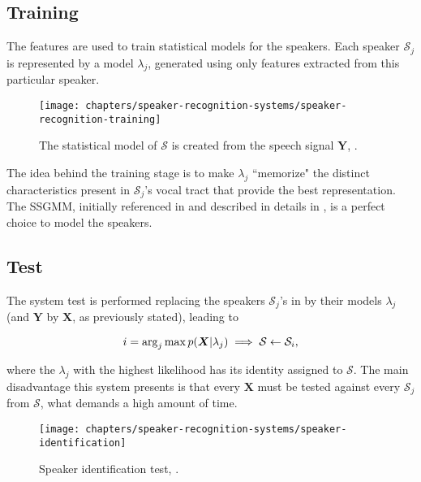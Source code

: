 \subsection{Training}

The features are used to train statistical models for the speakers. Each speaker $\mathcal{S}_j$ is represented by a model $\lambda_j$, generated using only features extracted from this particular speaker.

\begin{figure}[ht]
    \centering
    \texttt{[image: chapters/speaker-recognition-systems/speaker-recognition-training]}
    \caption{The statistical model of $\mathcal{S}$ is created from the speech signal $\boldsymbol{Y}$, .}
    \label{fig:speaker-recognition-training}
\end{figure}

The idea behind the training stage is to make $\lambda_j$ ``memorize" the distinct characteristics present in $\mathcal{S}_j$'s vocal tract that provide the best representation. The SSGMM, initially referenced in  and described in details in , is a perfect choice to model the speakers.

\subsection{Test}

The system test is performed replacing the speakers $\mathcal{S}_j$'s in  by their models $\lambda_j$ (and $\boldsymbol{Y}$ by $\boldsymbol{X}$, as previously stated), leading to

\begin{equation}
    i = \arg_j\max\postpdf{\boldsymbol{X}}{\lambda_j} \implies \mathcal{S} \gets \mathcal{S}_i,
    \label{eq:speaker_identification}
\end{equation}

\noindent where the $\lambda_j$ with the highest likelihood has its identity assigned to $\mathcal{S}$. The main disadvantage this system presents is that every $\boldsymbol{X}$ must be tested against every $\mathcal{S}_j$ from $\boldsymbol{\mathcal{S}}$, what demands a high amount of time.

\begin{figure}[ht]
    \centering
    \texttt{[image: chapters/speaker-recognition-systems/speaker-identification]}
    \caption{Speaker identification test, .}
    \label{fig:speaker_identification}
\end{figure}

